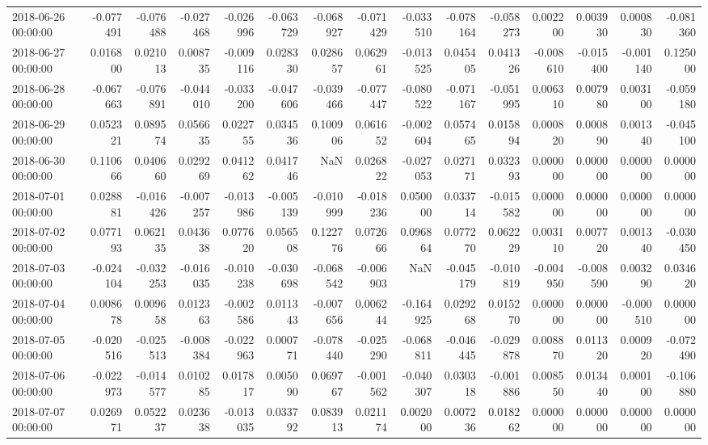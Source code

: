 \begin{tabular}{lrrrrrrrrrrrrrr}
2018-06-26 00:00:00 & -0.077491 & -0.076488 & -0.027468 & -0.026996 & -0.063729 & -0.068927 & -0.071429 & -0.033510 & -0.078164 & -0.058273 & 0.002200 & 0.003930 & 0.000830 & -0.081360 \\
2018-06-27 00:00:00 & 0.016800 & 0.021013 & 0.008735 & -0.009116 & 0.028330 & 0.028657 & 0.062961 & -0.013525 & 0.045405 & 0.041326 & -0.008610 & -0.015400 & -0.001140 & 0.125000 \\
2018-06-28 00:00:00 & -0.067663 & -0.076891 & -0.044010 & -0.033200 & -0.047606 & -0.039466 & -0.077447 & -0.080522 & -0.071167 & -0.051995 & 0.006310 & 0.007980 & 0.003100 & -0.059180 \\
2018-06-29 00:00:00 & 0.052321 & 0.089574 & 0.056635 & 0.022755 & 0.034536 & 0.100906 & 0.061652 & -0.002604 & 0.057465 & 0.015894 & 0.000820 & 0.000890 & 0.001340 & -0.045100 \\
2018-06-30 00:00:00 & 0.110666 & 0.040660 & 0.029269 & 0.041262 & 0.041746 & NaN & 0.026822 & -0.027053 & 0.027171 & 0.032393 & 0.000000 & 0.000000 & 0.000000 & 0.000000 \\
2018-07-01 00:00:00 & 0.028881 & -0.016426 & -0.007257 & -0.013986 & -0.005139 & -0.010999 & -0.018236 & 0.050000 & 0.033714 & -0.015582 & 0.000000 & 0.000000 & 0.000000 & 0.000000 \\
2018-07-02 00:00:00 & 0.077193 & 0.062135 & 0.043638 & 0.077620 & 0.056508 & 0.122776 & 0.072666 & 0.096864 & 0.077270 & 0.062229 & 0.003110 & 0.007720 & 0.001340 & -0.030450 \\
2018-07-03 00:00:00 & -0.024104 & -0.032253 & -0.016035 & -0.010238 & -0.030698 & -0.068542 & -0.006903 & NaN & -0.045179 & -0.010819 & -0.004950 & -0.008590 & 0.003290 & 0.034620 \\
2018-07-04 00:00:00 & 0.008678 & 0.009658 & 0.012363 & -0.002586 & 0.011343 & -0.007656 & 0.006244 & -0.164925 & 0.029268 & 0.015270 & 0.000000 & 0.000000 & -0.000510 & 0.000000 \\
2018-07-05 00:00:00 & -0.020516 & -0.025513 & -0.008384 & -0.022963 & 0.000771 & -0.078440 & -0.025290 & -0.068811 & -0.046445 & -0.029878 & 0.008870 & 0.011320 & 0.000920 & -0.072490 \\
2018-07-06 00:00:00 & -0.022973 & -0.014577 & 0.010285 & 0.017817 & 0.005090 & 0.069767 & -0.001562 & -0.040307 & 0.030318 & -0.001886 & 0.008550 & 0.013440 & 0.000100 & -0.106880 \\
2018-07-07 00:00:00 & 0.026971 & 0.052237 & 0.023638 & -0.013035 & 0.033792 & 0.083913 & 0.021174 & 0.002000 & 0.007236 & 0.018262 & 0.000000 & 0.000000 & 0.000000 & 0.000000 \\

\end{tabular}
